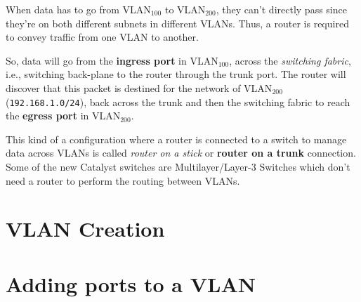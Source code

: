 \noindent
When data has to go from VLAN$_{100}$ to VLAN$_{200}$, they can't directly pass since they're on both different subnets in different VLANs. Thus, a router is required to convey traffic from one VLAN to another. 

So, data will go from the \textbf{ingress port} in VLAN$_{100}$, across the \textit{switching fabric}, i.e., switching back-plane to the router through the trunk port. The router will discover that this packet is destined for the network of VLAN$_{200}$ (\verb|192.168.1.0/24|), back across the trunk and then the switching fabric to reach the \textbf{egress port} in VLAN$_{200}$. 

This kind of a configuration where a router is connected to a switch to manage data across VLANs is called \textit{router on a stick} or \textbf{router on a trunk} connection. Some of the new Catalyst switches are Multilayer/Layer-3 Switches which don't need a router to perform the routing between VLANs. 

\section{VLAN Creation}


\section{Adding ports to a VLAN}

